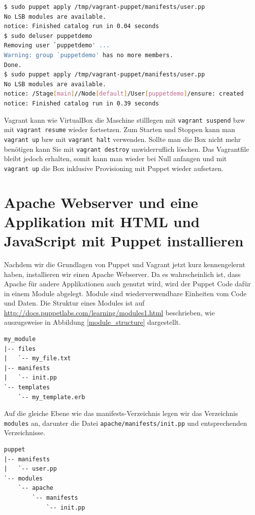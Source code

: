 \documentclass[12pt,a4paper,ngerman]{article}
\begin{document}
\begin{lstlisting}[language=sh,caption=Puppet apply im Box, label=vagrant-apply]
$ sudo puppet apply /tmp/vagrant-puppet/manifests/user.pp
No LSB modules are available.
notice: Finished catalog run in 0.04 seconds
$ sudo deluser puppetdemo
Removing user `puppetdemo' ...
Warning: group `puppetdemo' has no more members.
Done.
$ sudo puppet apply /tmp/vagrant-puppet/manifests/user.pp
No LSB modules are available.
notice: /Stage[main]//Node[default]/User[puppetdemo]/ensure: created
notice: Finished catalog run in 0.39 seconds
\end{lstlisting}

Vagrant kann wie VirtualBox die Maschine stilllegen mit \lstinline$vagrant suspend$ bzw mit \lstinline$vagrant resume$ wieder fortsetzen. Zum Starten und Stoppen kann man \lstinline$vagrant up$ bzw mit \lstinline$vagrant halt$ verwenden.  Sollte man die Box nicht mehr benötigen kann Sie mit \lstinline$vagrant destroy$ unwiderruflich löschen. Das Vagrantfile bleibt jedoch erhalten, somit kann man wieder bei Null anfangen und mit \lstinline$vagrant up$ die Box inklusive Provisioning mit Puppet wieder aufsetzen.

\section{Apache Webserver und eine Applikation mit HTML und JavaScript mit Puppet installieren}
Nachdem wir die Grundlagen von Puppet und Vagrant jetzt kurz kennengelernt haben, installieren wir einen Apache Webserver. Da es wahrscheinlich ist, dass Apache für andere Applikationen auch genutzt wird, wird der Puppet Code dafür in einem Module abgelegt. Module sind wiederverwendbare Einheiten vom Code und Daten. Die Struktur eines Modules ist auf \url{http://docs.puppetlabs.com/learning/modules1.html} beschrieben, wie auszugsweise in Abbildung \ref{module_structure} dargestellt.
\begin{lstlisting}[language=tree,caption=Puppet Module Struktur, label=module_structure]
my_module
|-- files
|   `-- my_file.txt
|-- manifests
|   `-- init.pp
`-- templates
    `-- my_template.erb
\end{lstlisting}


Auf die gleiche Ebene wie das manifests-Verzeichnis legen wir das Verzeichnis \lstinline$modules$ an, darunter die Datei \lstinline$apache/manifests/init.pp$ und entsprechenden Verzeichnisse.
\begin{lstlisting}[language=tree,caption=Verzeichnisstruktur für den apache-Module, label=apache-module]
puppet
|-- manifests
|   `-- user.pp
`-- modules
    `-- apache
        `-- manifests
            `-- init.pp
\end{lstlisting}
\end{document}
